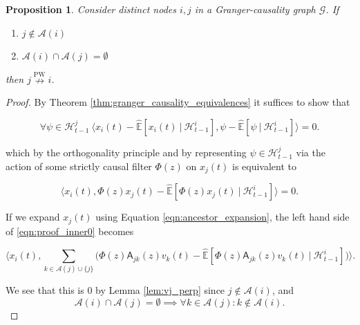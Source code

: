 \documentclass{statsoc}
\def\npwgc{\overset{\text{PW}}{\nrightarrow}}  %
\def\gcg{\mathcal{G}}  %
\def\A{\mathsf{A}}  %
\def\H{\mathcal{H}}  %
\newcommand{\linE}[2]{\hat{\E}[#1\ |\ #2]}  %
\newcommand{\anc}[1]{\mathcal{A}(#1)}  %
\newtheorem{proposition}{Proposition}
\def\H{\mathcal{H}}  %
\def\E{\mathbb{E}}  %
\newcommand{\inner}[2]{\langle #1, #2 \rangle}  %
\begin{document}
\begin{proposition}
  \label{prop:ancestor_uncorrelated}
  Consider distinct nodes $i, j$ in a Granger-causality graph $\gcg$.
  If

  \begin{enumerate}[label=(\alph*)]
  \item{$j \not\in \anc{i}$}
  \item{$\anc{i}\cap\anc{j} = \emptyset$}
  \end{enumerate}

  then $j \npwgc i$.
\end{proposition}
\begin{proof}
  By Theorem \ref{thm:granger_causality_equivalences} it suffices to show that

  \begin{equation*}
    \forall \psi \in \H_{t - 1}^j\ \inner{x_i(t) - \linE{x_i(t)}{\H_{t - 1}^i}}{\psi - \linE{\psi}{\H_{t - 1}^i}} = 0.
  \end{equation*}

  which by the orthogonality principle and by representing
  $\psi \in \H_{t - 1}^j$ via the action of some strictly causal filter
  $\Phi(z)$ on $x_j(t)$ is equivalent to

  \begin{equation}
    \label{eqn:proof_inner0}
    \inner{x_i(t)}{\Phi(z)x_j(t) - \linE{\Phi(z)x_j(t)}{\H_{t - 1}^i}} = 0.
  \end{equation}

  If we expand $x_j(t)$ using Equation \eqref{eqn:ancestor_expansion},
  the left hand side of \eqref{eqn:proof_inner0} becomes

  \begin{equation*}
    \inner{x_i(t)}{\sum_{k \in \anc{j} \cup \{j\}} \Big(\Phi(z)\A_{jk}(z)v_k(t) - \linE{\Phi(z)\A_{jk}(z)v_k(t)}{\H_{t - 1}^i}\Big)}.
  \end{equation*}

  We see that this is $0$ by Lemma \ref{lem:vj_perp} since
  $j \not \in \anc{i}$, and
  \[
    \anc{i} \cap \anc{j} = \emptyset \implies \forall k \in \anc{j}: k \not \in \anc{i}.
  \]
\end{proof}

\end{document}
